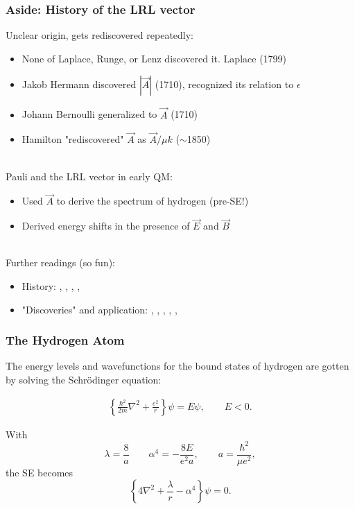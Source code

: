 \documentclass{beamer}
\theoremstyle{definition}
\newcommand{\lc}{\left\{}
\newcommand{\rc}{\right\}}
\newcommand{\f}[2]{\frac{#1}{#2}}
\newcommand{\al}{\alpha}
\begin{document}
\begin{frame}
\frametitle{Aside: History of the LRL vector}

Unclear origin, gets rediscovered repeatedly:
\begin{itemize}
	\item None of Laplace, Runge, or Lenz discovered it. Laplace (1799)
	\item Jakob Hermann discovered $|\vec{A}|$ (1710), recognized its relation to $\epsilon$
	\item  Johann Bernoulli generalized to $\vec{A}$ (1710)
	\item Hamilton "rediscovered" $\vec{A}$ as $\vec{A}/\mu k$ ($\sim$1850)
\end{itemize}
\,\,\, \\ 
Pauli and the LRL vector in early QM:
\begin{itemize}
	\item Used $\vec{A}$ to derive the spectrum of hydrogen (pre-SE!)
	
	\item Derived energy shifts in the presence of $\vec{E}$ and $\vec{B}$
\end{itemize}

\,\,\, \\
Further readings (so fun):  

\begin{itemize}
\item History: \cite{valent2003hydrogen}, 
\cite{stahlhofen2004pauli},
\cite{goldstein1975prehistory},
\cite{goldstein1976more},
\cite{goldstein2002classical}


\item "Discoveries"  and application: 
\cite{runge1919vektoranalysis},
\cite{laplace1823traite},
\cite{lenz1924bewegungsverlauf},
\cite{hamilton1847application},
\cite{hermann1710unknown},
\cite{pauli1926wasserstoffspektrum}
\end{itemize}





\end{frame}




\begin{frame}
	\frametitle{The Hydrogen Atom}
	
	The energy levels and wavefunctions for the bound states of hydrogen are gotten by solving the Schr\"{o}dinger equation:
	
	\begin{align*}
	\lc \f{\hbar^2 }{2m} \nabla^2 + \f{e^2}{r} \rc \psi = E\psi, \quad\quad E < 0.
	\end{align*}
	
	With
	\begin{equation}
	\label{eq:conds}
	\lambda = \f{8}{a} \quad\quad \al^4 = -\f{8E}{e^2 a}, \quad\quad a = \f{\hbar^2}{\mu e^2},
	\end{equation}
	the SE becomes
	\begin{equation}\label{eq:SE}
	\lc 4\nabla^2 + \f{\lambda}{r} -\al^4  \rc \psi = 0.
	\end{equation}
	
\end{frame}
\end{document}
